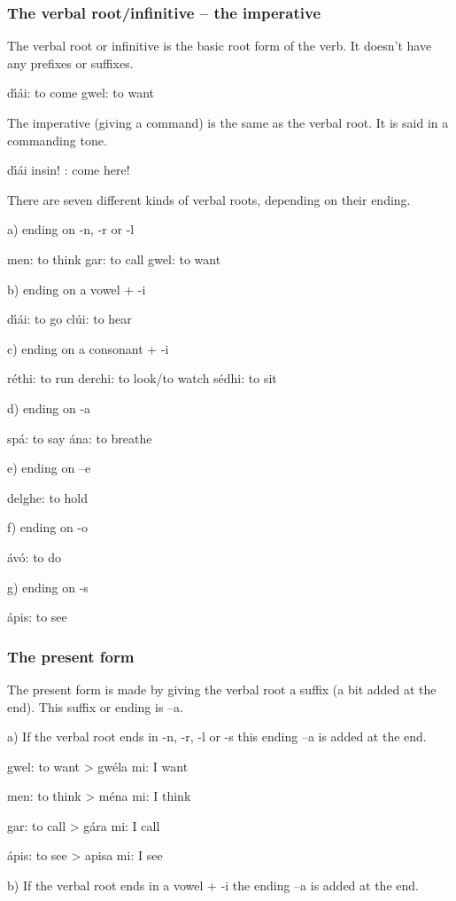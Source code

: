 \subsubsection{The verbal root/infinitive – the imperative}

The verbal root or infinitive is the basic root form of the verb. It doesn’t have any prefixes or suffixes. 

d\'{\i}\'{a}i: to come
gwel: to want

The imperative (giving a command) is the same as the verbal root. It is said in a commanding tone.

d\'{\i}\'{a}i insin! : come here!

There are seven different kinds of verbal roots, depending on their ending.

a) ending on -n, -r or -l

men: to think
gar: to call
gwel: to want

b) ending on a vowel + -i

d\'{\i}\'{a}i: to go
cl\'{u}i: to hear

c) ending on a consonant + -i

r\'{e}thi: to run
derchi: to look/to watch
s\'{e}dhi: to sit

d) ending on -a

sp\'{a}: to say
\'{a}na: to breathe

e) ending on –e

delghe: to hold

f) ending on -o

\'{a}v\'{o}: to do

g) ending on -s

\'{a}pis: to see


\subsubsection{The present form}

The present form is made by giving the verbal root a suffix (a bit added at the end). This suffix or ending is –a. 

a) If the verbal root ends in -n, -r, -l or -s this ending –a is added at the end.

gwel: to want
> gw\'{e}la mi: I want

men: to think
> m\'{e}na mi: I think

gar: to call
> g\'{a}ra mi: I call

\'{a}pis: to see
> apisa mi: I see

b) If the verbal root ends in a vowel + -i the ending –a is added at the end.

